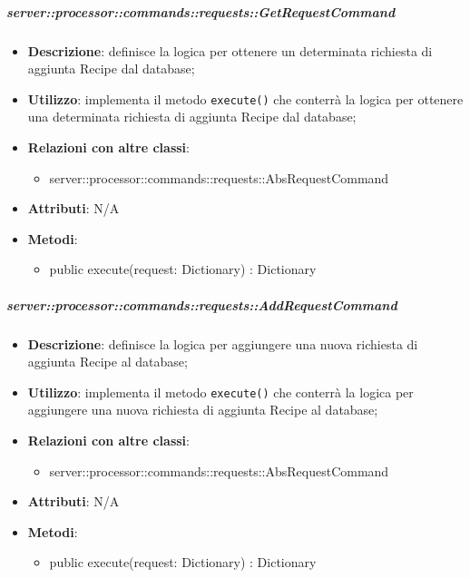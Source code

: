         \subparagraph{server::processor::commands::requests::GetRequestCommand} %
        \label{subp:bdsm_app_server_processor_commands_requests_getrequestcommand}
        \begin{itemize}
          \item \textbf{Descrizione}: definisce la logica per ottenere un determinata richiesta di aggiunta Recipe dal database;
          \item \textbf{Utilizzo}: implementa il metodo \texttt{execute()} che conterrà la logica per ottenere una determinata richiesta di aggiunta Recipe dal database;
          \item \textbf{Relazioni con altre classi}:
            \begin{itemize}
              \item server::processor::commands::requests::AbsRequestCommand
            \end{itemize}
			\item \textbf{Attributi}: N/A
			\item \textbf{Metodi}:
        	\begin{itemize}
          		\item public execute(request: Dictionary) : Dictionary
        	\end{itemize}
        \end{itemize}

        \subparagraph{server::processor::commands::requests::AddRequestCommand} %
        \label{subp:bdsm_app_server_processor_commands_requests_addrequestcommand}
        \begin{itemize}
          \item \textbf{Descrizione}: definisce la logica per aggiungere una nuova richiesta di aggiunta Recipe al database;
          \item \textbf{Utilizzo}: implementa il metodo \texttt{execute()} che conterrà la logica per aggiungere una nuova richiesta di aggiunta Recipe al database;
          \item \textbf{Relazioni con altre classi}:
            \begin{itemize}
              \item server::processor::commands::requests::AbsRequestCommand
            \end{itemize}
			\item \textbf{Attributi}: N/A
			\item \textbf{Metodi}:
        	\begin{itemize}
          		\item public execute(request: Dictionary) : Dictionary
        	\end{itemize}
        \end{itemize}

